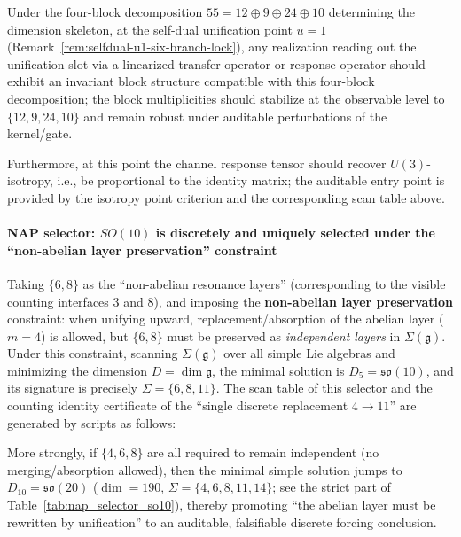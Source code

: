 \begin{proposition}\label{prop:gut-u1-four-block-spectrum-signature}
Under the four-block decomposition
\(
55=12\oplus 9\oplus 24\oplus 10
\)
determining the dimension skeleton, at the self-dual unification point \(u=1\) (Remark~\ref{rem:selfdual-u1-six-branch-lock}), any realization reading out the unification slot via a linearized transfer operator or response operator should exhibit an invariant block structure compatible with this four-block decomposition; the block multiplicities should stabilize at the observable level to \(\{12,9,24,10\}\) and remain robust under auditable perturbations of the kernel/gate.\par
Furthermore, at this point the channel response tensor should recover \(U(3)\)-isotropy, i.e., be proportional to the identity matrix; the auditable entry point is provided by the isotropy point criterion and the corresponding scan table above.
\end{proposition}

\paragraph{NAP selector: \texorpdfstring{$SO(10)$}{SO(10)} is discretely and uniquely selected under the ``non-abelian layer preservation'' constraint}
Taking \(\{6,8\}\) as the ``non-abelian resonance layers'' (corresponding to the visible counting interfaces \(3\) and \(8\)), and imposing the \textbf{non-abelian layer preservation} constraint:
when unifying upward, replacement/absorption of the abelian layer (\(m=4\)) is allowed, but \(\{6,8\}\) must be preserved as \emph{independent layers} in \(\Sigma(\mathfrak g)\).
Under this constraint, scanning \(\Sigma(\mathfrak g)\) over all simple Lie algebras and minimizing the dimension \(D=\dim\mathfrak g\),
the minimal solution is \(D_5=\mathfrak{so}(10)\), and its signature is precisely \(\Sigma=\{6,8,11\}\).
The scan table of this selector and the counting identity certificate of the ``single discrete replacement \(4\to 11\)'' are generated by scripts as follows:


\par
More strongly, if \(\{4,6,8\}\) are all required to remain independent (no merging/absorption allowed), then the minimal simple solution jumps to \(D_{10}=\mathfrak{so}(20)\) (\(\dim=190\), \(\Sigma=\{4,6,8,11,14\}\); see the strict part of Table~\ref{tab:nap_selector_so10}),
thereby promoting ``the abelian layer must be rewritten by unification'' to an auditable, falsifiable discrete forcing conclusion.

